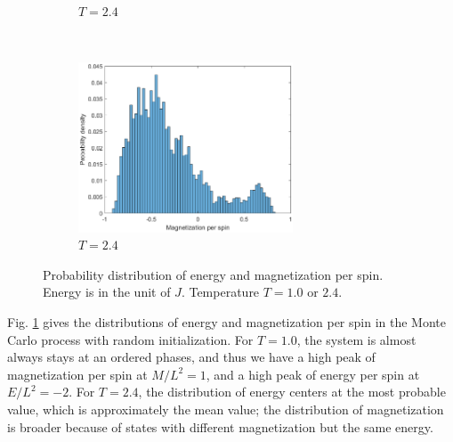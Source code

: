 \begin{figure}[tb]
\begin{subfigure}[tb]{0.5\textwidth}
		\caption{$T=2.4$}
	\end{subfigure}
	~
	\begin{subfigure}[tb]{0.5\textwidth}
		\centering
		\includegraphics[width=0.7\textwidth]{Prob_mag_highT.eps}		
		\caption{$T=2.4$}
	\end{subfigure}
	\caption{Probability distribution of energy and magnetization per spin. 
		Energy is in the unit of $J$. Temperature $T=1.0$ or $2.4$. }
	\label{fig:prob}
\end{figure}
Fig. \ref{fig:prob} gives the distributions of energy and magnetization per spin in the Monte Carlo process with random initialization. 
For $T=1.0$, the system is almost always stays at an ordered phases, 
and thus we have a high peak of magnetization per spin at $M/L^2=1$, and a high peak of energy per spin at $E/L^2=-2$. 
For $T=2.4$, the distribution of energy centers at the most probable value, which is approximately the mean value; 
the distribution of magnetization is broader because of states with different magnetization but the same energy. 

